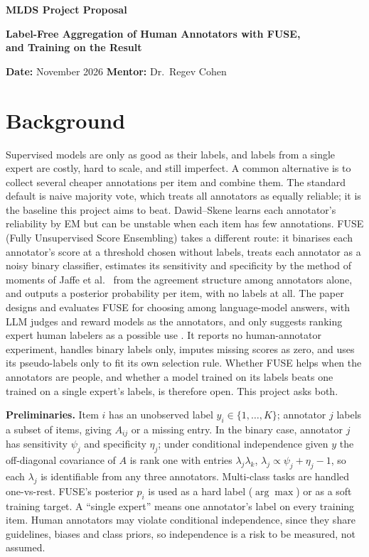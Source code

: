\documentclass[10pt]{article}
\newcommand{\proposalname}{MLDS Project Proposal}
\begin{document}
{\Large\bfseries \proposalname\par}
\vspace{0.1em}
{\large\bfseries Label-Free Aggregation of Human Annotators with FUSE,\\
and Training on the Result\par}
\vspace{0.4em}

\textbf{Date:} November 2026 \qquad \textbf{Mentor:} Dr.\ Regev Cohen

\section*{Background}

Supervised models are only as good as their labels, and labels from a single expert are
costly, hard to scale, and still imperfect. A common alternative is to collect several cheaper
annotations per item and combine them. The standard
default is naive majority vote, which treats all annotators as equally reliable; it is the
baseline this project aims to beat. Dawid--Skene \cite{ds} learns each annotator's reliability by EM but can be
unstable when each item has few annotations. FUSE (Fully Unsupervised Score Ensembling)
\cite{fuse} takes a different route: it binarises each annotator's score at a threshold chosen
without labels, treats each annotator as a noisy binary classifier, estimates its sensitivity and specificity by the method of moments of Jaffe et
al.~\cite{jaffe} from the agreement structure among annotators alone, and outputs a
posterior probability per item, with no labels at all. The paper designs and evaluates FUSE for choosing among language-model answers, with LLM
judges and reward models as the annotators, and only suggests ranking expert human labelers as a possible use \cite[Sec.~5]{fuse}. It reports no human-annotator experiment, handles
binary labels only, imputes missing scores as zero, and uses its pseudo-labels only to fit
its own selection rule. Whether FUSE helps when the annotators are people, and whether a
model trained on its labels beats one trained on a single expert's labels, is therefore
open. This project asks both.

\textbf{Preliminaries.} Item $i$ has an unobserved label $y_i\in\{1,\dots,K\}$; annotator
$j$ labels a subset of items, giving $A_{ij}$ or a missing entry. In the binary case, annotator
$j$ has sensitivity $\psi_j$ and specificity $\eta_j$; under conditional independence given
$y$ the off-diagonal covariance of $A$ is rank one with entries $\lambda_j\lambda_k$,
$\lambda_j\propto\psi_j+\eta_j-1$, so each $\lambda_j$ is identifiable from any three
annotators. Multi-class tasks are handled one-vs-rest. FUSE's posterior $p_i$ is used as a
hard label ($\arg\max$) or as a soft training target. A ``single expert'' means one
annotator's label on every training item. Human annotators may violate conditional independence, since they share guidelines, biases and class
priors, so independence is a risk to be measured, not assumed.
\end{document}
